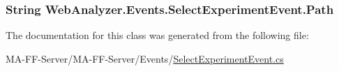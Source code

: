\subsubsection[{Path}]{\setlength{\rightskip}{0pt plus 5cm}String Web\+Analyzer.\+Events.\+Select\+Experiment\+Event.\+Path\hspace{0.3cm}{\ttfamily [get]}}\label{class_web_analyzer_1_1_events_1_1_select_experiment_event_a7c9d614ac51f5dadaba4f5dd5e38c9d3}


The documentation for this class was generated from the following file\+:\begin{DoxyCompactItemize}
\item 
M\+A-\/\+F\+F-\/\+Server/\+M\+A-\/\+F\+F-\/\+Server/\+Events/\hyperlink{_select_experiment_event_8cs}{Select\+Experiment\+Event.\+cs}\end{DoxyCompactItemize}
